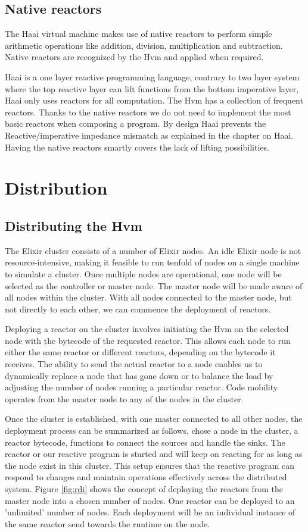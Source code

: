 \documentclass[a4paper]{book}
\begin{document}
\section{Native reactors}
The Haai virtual machine makes use of native reactors to perform simple arithmetic operations like addition, division, multiplication and subtraction. Native reactors are recognized by the Hvm and applied when required.

Haai is a one layer reactive programming language, contrary to two layer system where the top reactive layer can lift functions from the bottom imperative layer, Haai only uses reactors for all computation. The Hvm has a collection of frequent reactors. Thanks to the native reactors we do not need to implement the most basic reactors when composing a program. By design Haai prevents the Reactive/imperative impedance mismatch as explained in the chapter on Haai. Having the native reactors smartly covers the lack of lifting possibilities.

\chapter{Distribution} \label{sec:distribution}
\section{Distributing the Hvm}
The Elixir cluster consists of a number of Elixir nodes. An idle Elixir node is not resource-intensive, making it feasible to run tenfold of nodes on a single machine to simulate a cluster. Once multiple nodes are operational, one node will be selected as the controller or master node. The master node will be made aware of all nodes within the cluster. With all nodes connected to the master node, but not directly to each other, we can commence the deployment of reactors.

Deploying a reactor on the cluster involves initiating the Hvm on the selected node with the bytecode of the requested reactor. This allows each node to run either the same reactor or different reactors, depending on the bytecode it receives. The ability to send the actual reactor to a node enables us to dynamically replace a node that has gone down or to balance the load by adjusting the number of nodes running a particular reactor. Code mobility operates from the master node to any of the nodes in the cluster.

Once the cluster is established, with one master connected to all other nodes, the deployment process can be summarized as follows, chose a node in the cluster, a reactor bytecode, functions to connect the sources and handle the sinks. The reactor or our reactive program is started and will keep on reacting for as long as the node exist in this cluster. 
This setup ensures that the reactive program can respond to changes and maintain operations effectively across the distributed system. Figure \ref{fig:rdi} shows the concept of deploying the reactors from the master node into a chosen number of nodes. One reactor can be deployed to an 'unlimited' number of nodes. Each deployment will be an individual instance of the same reactor send towards the runtime on the node. 
\end{document}
